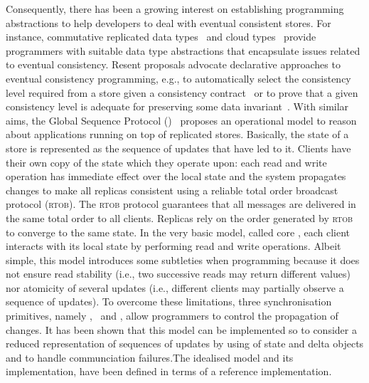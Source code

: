 Consequently,  there has been a growing interest on establishing  programming abstractions to help developers 
to deal with eventual consistent stores. For instance, commutative replicated data types~\cite{DBLP:conf/sss/ShapiroPBZ11}  and 
cloud types~\cite{burckhardt2012cloud} provide programmers with suitable data type abstractions that encapsulate issues related 
to eventual consistency. Resent proposals advocate declarative approaches to 
eventual consistency programming,  e.g.,  
to automatically select the consistency level required from a store given 
a consistency contract~\cite{sivaramakrishnan2015declarative}
or to prove that  a given consistency level is adequate for preserving some data invariant~\cite{gotsman2016cause}.
With similar aims,
the Global Sequence Protocol (\gsp)~\cite{DBLP:conf/ecoop/BurckhardtLPF15} proposes  an operational model  
 to reason about applications 
running on top of replicated stores. Basically, the state of a store is represented as the sequence of updates that 
have led to it. Clients have their own copy of the state which they operate upon: each read and write operation has immediate
effect over the local state and the system propagates changes to make all replicas consistent using 
a reliable total order broadcast  protocol (\textsc{rtob}). The \textsc{rtob} protocol guarantees that all messages
are delivered  in the same total order to all clients. Replicas rely on the order generated  by \textsc{rtob} to 
converge to the same state. In the very basic model, called core \gsp, each client interacts with its local state 
  by performing read and write operations. Albeit simple, this model  introduces some subtleties when programming 
  because  it does not ensure read stability (i.e., two successive reads may 
return different values) nor atomicity of several updates (i.e., different clients may partially observe 
a sequence of updates). To overcome these limitations, 
 three synchronisation primitives, namely \pullcmd, \pushcmd\ and \confcmd, 
 allow programmers to control the propagation of changes. %
It has been shown that this model can be implemented so to  
consider a reduced representation of sequences of updates by using of state and delta objects and to handle communciation
failures.The idealised model and its implementation,
have been defined in terms of a reference implementation. 

